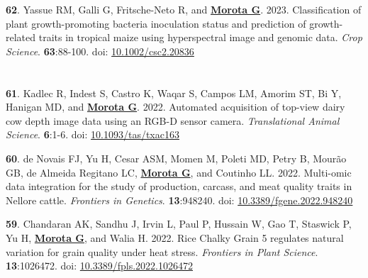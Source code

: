 \documentclass[margin,line,10pt]{res}
\newenvironment{list1}{
  \begin{list}{\ding{113}}{%
      \setlength{\itemsep}{0in}
      \setlength{\parsep}{0in} \setlength{\parskip}{0in}
      \setlength{\topsep}{0in} \setlength{\partopsep}{0in} 
      \setlength{\leftmargin}{0.17in}}}{\end{list}}
\begin{document}
\begin{resume}
\begin{list1}
  \vspace{0.5cm}

  \item [{\bf 62}.] Yassue RM, Galli G, Fritsche-Neto R, and \textbf{\underline{Morota G}}. 2023. Classification of plant growth-promoting bacteria inoculation status and prediction of growth-related traits in tropical maize using hyperspectral image and genomic data. \emph{Crop Science}. \textbf{63}:88-100. doi: \textcolor{blue}{\href{https://doi.org/10.1002/csc2.20836}{10.1002/csc2.20836}}  


\end{list1}


\section{}
\begin{list1}

  \item  [{\bf 61}.] Kadlec R, Indest S, Castro K, Waqar S, Campos LM, Amorim ST, Bi Y, Hanigan MD, and \textbf{\underline{Morota G}}. 2022. Automated acquisition of top-view dairy cow depth image data using an RGB-D sensor camera. \emph{Translational Animal Science}. \textbf{6}:1-6. doi: \textcolor{blue}{\href{https://doi.org/10.1093/tas/txac163}{10.1093/tas/txac163}}  

  \vspace{0.5cm}

  \item [{\bf 60}.] de Novais FJ, Yu H, Cesar ASM, Momen M, Poleti MD, Petry B, Mour{\~a}o GB, de Almeida Regitano LC, \textbf{\underline{Morota G}}, and Coutinho LL. 2022. Multi-omic data integration for the study of production, carcass, and meat quality traits in Nellore cattle. \emph{Frontiers in Genetics}. \textbf{13}:948240. doi: \textcolor{blue}{\href{https://doi.org/10.3389/fgene.2022.948240}{10.3389/fgene.2022.948240}} 


  \vspace{0.5cm}

  \item  [{\bf 59}.] Chandaran AK, Sandhu J, Irvin L,  Paul P, Hussain W, Gao T, Staswick P, Yu H, \textbf{\underline{Morota G}}, and Walia H. 2022. Rice Chalky Grain 5 regulates natural variation for grain quality under heat stress. \emph{Frontiers in Plant Science}. \textbf{13}:1026472. doi: \textcolor{blue}{\href{https://doi.org/10.3389/fpls.2022.1026472}{10.3389/fpls.2022.1026472}} 
           
  \vspace{0.5cm}


\end{list1}
\end{resume}
\end{document}
